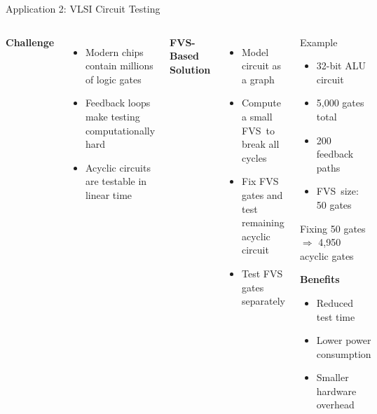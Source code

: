 \documentclass[aspectratio=169]{beamer}
\newcommand{\fvs}{\textsc{FVS}}
\begin{document}
\begin{frame}{Application 2: VLSI Circuit Testing}
	\begin{columns}[T]

		\textbf{Challenge}
		\begin{itemize}
			\item Modern chips contain millions of logic gates
			\item Feedback loops make testing computationally hard
			\item Acyclic circuits are testable in linear time
		\end{itemize}

		\vspace{0.1cm}

		\textbf{FVS-Based Solution}
		\begin{itemize}
			\item Model circuit as a graph
			\item Compute a small \fvs\ to break all cycles
			\item Fix FVS gates and test remaining acyclic circuit
			\item Test FVS gates separately
		\end{itemize}

		\vspace{0.1cm}
		\hspace{-0.4cm}
		\begin{block}{Example}
			\begin{itemize}
				\item 32-bit ALU circuit
				\item 5,000 gates total
				\item 200 feedback paths
				\item \fvs\ size: 50 gates
			\end{itemize}

			Fixing 50 gates $\Rightarrow$ 4,950 acyclic gates

			\vspace{0.2cm}

			\textbf{Benefits}
			\begin{itemize}
				\item Reduced test time
				\item Lower power consumption
				\item Smaller hardware overhead
			\end{itemize}
		\end{block}
	\end{columns}
\end{frame}
\end{document}
